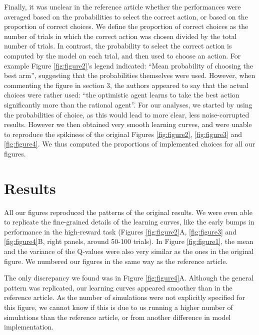 \documentclass[10pt,a4paper,onecolumn]{article}
\begin{document}
Finally, it was unclear in the reference article whether the performances 
were averaged based on the probabilities to select the correct action, 
or based on the proportion of correct choices. We define the proportion 
of correct choices as the number of trials in which the correct action 
was chosen divided by the total number of trials. In contrast, the 
probability to select the correct action is computed by the model 
on each trial, and then used to choose an action. For example
Figure \ref{fig:figure2}'s legend indicated: ``Mean probability of choosing the best
arm'', suggesting that the probabilities themselves were used. However,
when commenting the figure in section 3, the authors appeared to say
that the actual choices were rather used: ``the optimistic agent learns
to take the best action significantly more than the rational agent''.
For our analyses, we started by using the probabilities of choice, as
this would lead to more clear, less noise-corrupted results. However we
then obtained very smooth learning curves, and were unable to reproduce
the spikiness of the original Figures \ref{fig:figure2}, 
\ref{fig:figure3} and \ref{fig:figure4}. We thus computed the
proportions of implemented choices for all our figures.

\hypertarget{results}{%
\section{Results}\label{results}}

All our figures reproduced the patterns of the original results. We were
even able to replicate the fine-grained details of the learning curves,
like the early bumps in performance in the high-reward task (Figures
 \ref{fig:figure2}A, \ref{fig:figure3} and \ref{fig:figure4}B, right
panels, around 50-100 trials). In Figure \ref{fig:figure1}, the mean
and the variance of the Q-values were also very similar as the ones in
the original figure. We numbered our figures in the same way as the reference article. 

The only discrepancy we found was in Figure \ref{fig:figure4}A.
Although the general pattern was replicated, our learning curves
appeared smoother than in the reference article. As the number of
simulations were not explicitly specified for this figure, we cannot
know if this is due to us running a higher number of simulations than
the reference article, or from another difference in model
implementation.
\end{document}
